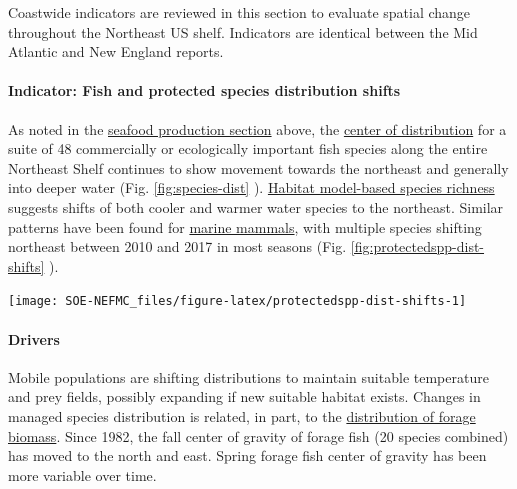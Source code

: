 \documentclass[
  10pt,
]{article}
\let\origfigure\figure
\let\endorigfigure\endfigure
\renewenvironment{figure}[1][2] {
    \expandafter\origfigure\expandafter[H]
} {
    \endorigfigure
}
\begin{document}
Coastwide indicators are reviewed in this section to evaluate spatial change throughout the Northeast US shelf. Indicators are identical between the Mid Atlantic and New England reports.

\hypertarget{indicator-fish-and-protected-species-distribution-shifts}{%
\paragraph{Indicator: Fish and protected species distribution shifts}\label{indicator-fish-and-protected-species-distribution-shifts}}

As noted in the \protect\hyperlink{implications}{seafood production section} above, the \href{https://noaa-edab.github.io/catalog/species_dist.html}{center of distribution} for a suite of 48 commercially or ecologically important fish species along the entire Northeast Shelf continues to show movement towards the northeast and generally into deeper water (Fig. \ref{fig:species-dist} ). \href{https://noaa-edab.github.io/catalog/habitat_diversity.html}{Habitat model-based species richness} suggests shifts of both cooler and warmer water species to the northeast. Similar patterns have been found for \href{https://noaa-edab.github.io/catalog/HMS_species_distribution.html}{marine mammals}, with multiple species shifting northeast between 2010 and 2017 in most seasons (Fig. \ref{fig:protectedspp-dist-shifts} ).

\begin{figure}

{\centering \texttt{[image: SOE-NEFMC\_files/figure-latex/protectedspp-dist-shifts-1]} 

}

\caption{Direction and magnitude of core habitat shifts, represented by the length of the line of the seasonal weighted centroid for species with more than 70 km difference between 2010 and 2017 (tip of arrow).}\label{fig:protectedspp-dist-shifts}
\end{figure}

\hypertarget{drivers}{%
\paragraph{Drivers}\label{drivers}}

Mobile populations are shifting distributions to maintain suitable temperature and prey fields, possibly expanding if new suitable habitat exists. Changes in managed species distribution is related, in part, to the \href{https://noaa-edab.github.io/catalog/forage_index.html}{distribution of forage biomass}. Since 1982, the fall center of gravity of forage fish (20 species combined) has moved to the north and east. Spring forage fish center of gravity has been more variable over time.
\end{document}
